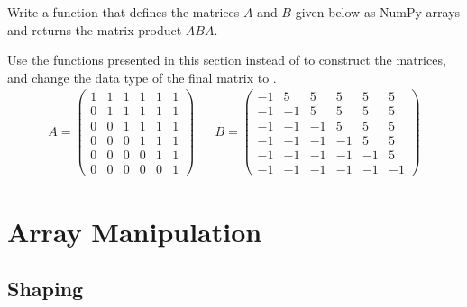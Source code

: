 \begin{problem} %
Write a function that defines the matrices $A$ and $B$ given below as NumPy arrays and returns the matrix product $ABA$.

Use the functions presented in this section instead of  to construct the matrices, and change the data type of the final matrix to .
\begin{align*}
A = \left(\begin{array}{rrrrrr}
1 & 1 & 1 & 1 & 1 & 1\\
0 & 1 & 1 & 1 & 1 & 1\\
0 & 0 & 1 & 1 & 1 & 1\\
0 & 0 & 0 & 1 & 1 & 1\\
0 & 0 & 0 & 0 & 1 & 1\\
0 & 0 & 0 & 0 & 0 & 1\end{array}\right)
&&
B = \left(\begin{array}{rrrrrr}
-1 &  5 &  5 &  5 &  5 &  5\\
-1 & -1 &  5 &  5 &  5 &  5\\
-1 & -1 & -1 &  5 &  5 &  5\\
-1 & -1 & -1 & -1 &  5 &  5\\
-1 & -1 & -1 & -1 & -1 &  5\\
-1 & -1 & -1 & -1 & -1 & -1\end{array}\right)
\end{align*}
\label{prob:simple3}
\end{problem}


\section*{Array Manipulation} %

\subsection*{Shaping} %

